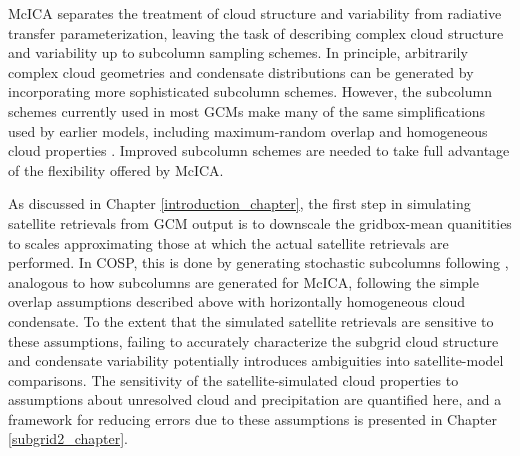 McICA separates the treatment of cloud structure and variability from radiative transfer parameterization, leaving the task of describing complex cloud structure and variability up to subcolumn sampling schemes. In principle, arbitrarily complex cloud geometries and condensate distributions can be generated by incorporating more sophisticated subcolumn schemes. However, the subcolumn schemes currently used in most GCMs make many of the same simplifications used by earlier models, including maximum-random overlap and homogeneous cloud properties \citep[e.g.,][]{neale_et_al_2010a, neale_et_al_2010b}. Improved subcolumn schemes are needed to take full advantage of the flexibility offered by McICA.

As discussed in Chapter \ref{introduction_chapter}, the first step in simulating satellite retrievals from GCM output is to downscale the gridbox-mean quanitities to scales approximating those at which the actual satellite retrievals are performed. In COSP, this is done by generating stochastic subcolumns following \cite{klein_and_jakob_1999}, analogous to how subcolumns are generated for McICA, following the simple overlap assumptions described above with horizontally homogeneous cloud condensate. To the extent that the simulated satellite retrievals are sensitive to these assumptions, failing to accurately characterize the subgrid cloud structure and condensate variability potentially introduces ambiguities into satellite-model comparisons. The sensitivity of the satellite-simulated cloud properties to assumptions about unresolved cloud and precipitation are quantified here, and a framework for reducing errors due to these assumptions is presented in Chapter \ref{subgrid2_chapter}.


